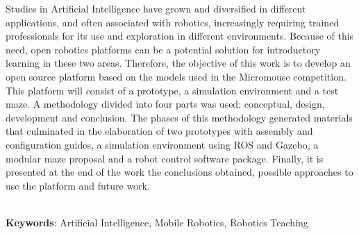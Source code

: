 \begin{thesisabastract}
Studies in Artificial Intelligence have grown and diversified in different applications, and often associated with robotics, increasingly requiring trained professionals for its use and exploration in different environments. Because of this need, open robotics platforms can be a potential solution for introductory learning in these two areas. Therefore, the objective of this work is to develop an open source platform based on the models used in the Micromouse competition. This platform will consist of a prototype, a simulation environment and a test maze. A methodology divided into four parts was used: conceptual, design, development and conclusion. The phases of this methodology generated materials that culminated in the elaboration of two prototypes with assembly and configuration guides, a simulation environment using ROS and Gazebo, a modular maze proposal and a robot control software package. Finally, it is presented at the end of the work the conclusions obtained, possible approaches to use the platform and future work.

\ \\


\textbf{Keywords}: Artificial Intelligence, Mobile Robotics, Robotics Teaching

\end{thesisabastract}
